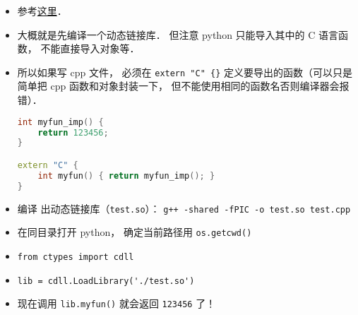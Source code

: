 
\begin{issues}
\issueDraft
\end{issues}

\begin{itemize}
\item 参考\href{https://www.geeksforgeeks.org/how-to-call-c-c-from-python/}{这里}．
\item 大概就是先编译一个动态链接库． 但注意 python 只能导入其中的 C 语言函数， 不能直接导入对象等．
\item 所以如果写 cpp 文件， 必须在 \verb|extern "C" {}| 定义要导出的函数（可以只是简单把 cpp 函数和对象封装一下， 但不能使用相同的函数名否则编译器会报错）．
\begin{lstlisting}[language=cpp, caption=test.cpp]
int myfun_imp() {
	return 123456;
}

extern "C" {
	int myfun() { return myfun_imp(); }
}
\end{lstlisting}
\item 编译 出动态链接库（\verb|test.so|）： \verb|g++ -shared -fPIC -o test.so test.cpp|
\item 在同目录打开 python， 确定当前路径用 \verb|os.getcwd()|
\item \verb|from ctypes import cdll|
\item \verb|lib = cdll.LoadLibrary('./test.so')|
\item 现在调用 \verb|lib.myfun()| 就会返回 \verb|123456| 了！
\end{itemize}
